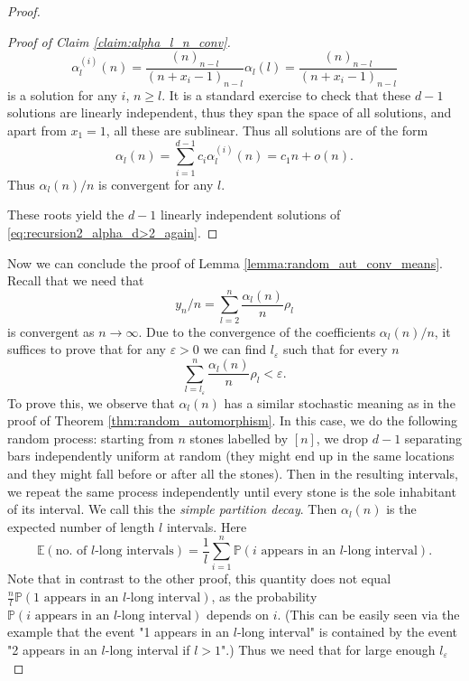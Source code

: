 \documentclass[10pt,a4paper]{amsart}
\newcommand{\EE}{\mathbb{E}}
\newcommand{\PP}{\mathbb{P}}
\begin{document}
\begin{proof}
\begin{proof}[Proof of Claim \ref{claim:alpha_l_n_conv}]
    $$\alpha_l^{(i)}(n) = \frac{(n)_{n-l}}{(n+x_i-1)_{n-l}}\alpha_l(l)=\frac{(n)_{n-l}}{(n+x_i-1)_{n-l}}$$
    is a solution for any $i$, $n\geq l$. It is a standard exercise to check that these $d-1$ solutions are linearly independent, thus they span the space of all solutions, and apart from $x_1=1$, all these are sublinear. Thus all solutions are of the form
    $$\alpha_l(n)=\sum_{i=1}^{d-1}c_i\alpha_l^{(i)}(n) =c_1n+o(n).$$
    Thus $\alpha_l(n)/n$ is convergent for any $l$.
    
    These roots yield the $d-1$ linearly independent solutions of \eqref{eq:recursion2_alpha_d>2_again}. 
    \end{proof}

    Now we can conclude the proof of Lemma \ref{lemma:random_aut_conv_means}. Recall that we need that
    \begin{equation}\label{eq:y_n_from_rho}
    y_n/n =\sum_{l=2}^{n}\frac{\alpha_l(n)}{n}\rho_l
    \end{equation}
    is convergent as $n\to\infty$. Due to the convergence of the coefficients $\alpha_l(n)/n$, it suffices to prove that for any $\varepsilon>0$ we can find $l_\varepsilon$ such that for every $n$
    $$\sum_{l=l_\varepsilon}^{n}\frac{\alpha_l(n)}{n}\rho_l<\varepsilon.$$
    To prove this, we observe that $\alpha_l(n)$ has a similar stochastic meaning as in the proof of Theorem \ref{thm:random_automorphism}. In this case, we do the following random process: starting from $n$ stones labelled by $[n]$, we drop $d-1$ separating bars independently uniform at random (they might end up in the same locations and they might fall before or after all the stones). Then in the resulting intervals, we repeat the same process independently until every stone is the sole inhabitant of its interval. We call this the {\it simple partition decay}. Then $\alpha_l(n)$ is the expected number of length $l$ intervals. Here
    \begin{equation}\label{eq:alpha_stochastic_meaning}
    \EE(\text{no. of $l$-long intervals})=\frac{1}{l}\sum_{i=1}^n\PP(\text{$i$ appears in an $l$-long interval}).
    \end{equation}
    Note that in contrast to the other proof, this quantity does not equal
    $\frac{n}{l}\PP(\text{1 appears in an $l$-long interval})$, as the probability $\PP(\text{$i$ appears in an $l$-long interval})$ depends on $i$. (This can be easily seen via the example that the event "1 appears in an $l$-long interval" is contained by the event "2 appears in an $l$-long interval if $l>1$".) Thus we need that for large enough $l_\varepsilon$

\end{proof}
\end{document}
